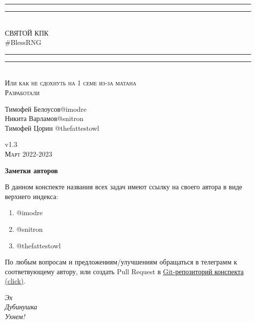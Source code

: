 \documentclass{article}
\begin{document}
\begin{titlepage}
    \centering
    \vspace*{\baselineskip}
    \rule{\textwidth}{1.6pt}\vspace*{-\baselineskip}\vspace*{2pt}
    \rule{\textwidth}{0.4pt}\\[\baselineskip]
{\LARGE СВЯТОЙ КПК\\ [0.3\baselineskip] \#BlessRNG}\\[0.2\baselineskip]
    \rule{\textwidth}{0.4pt}\vspace*{-\baselineskip}\vspace{3.2pt}
    \rule{\textwidth}{1.6pt}\\[\baselineskip]
    \scshape
    Или как не сдохнуть на 1 семе из-за матана \\
    \vspace*{2\baselineskip}
    Разработали \\[\baselineskip]
    {\Large Тимофей Белоусов\quad @imodre \\ Никита Варламов\quad @snitron \\ Тимофей Цорин \quad @thefattestowl\par}
    \vfill
    v1.3\\
    {\scshape Март 2022-2023} \par
\end{titlepage}

\textbf{Заметки авторов}

В данном конспекте названия всех задач имеют ссылку на своего автора в виде верхнего индекса:
\begin{enumerate}
    \item @imodre
    \item @snitron
    \item @thefattestowl
\end{enumerate}
По любым вопросам и предложениям/улучшениям обращаться в телеграмм к соответвующему автору, или создать Pull Request в \href{https://github.com/snitron/ct-itmo}{Git-репозиторий конспекта (click)}.

\newpage

\begin{flushright}
\emph{Эх\\
Дубинушка\\
Ухнем!}
\end{flushright}

\tableofcontents


\setlength{\parskip}{6pt}%
\newpage
{}
\end{document}
